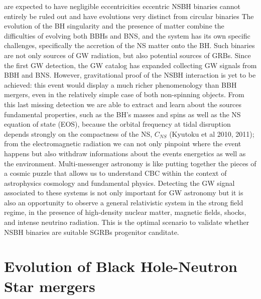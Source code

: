 \documentclass[binding=0.6cm, LaM]{sapthesis}
\begin{document}
        are expected to have negligible eccentricities %
        eccentric NSBH binaries cannot entirely be ruled out
        and have evolutions very distinct from circular binaries %
        The evolution of the BH singularity and the presence of matter combine
        the difficulties of evolving both BBHs and BNS, and the system has its own specific challenges,
        specifically the accretion of the NS matter onto the BH.
        Such binaries are not only sources of GW radiation, but also potential sources of GRBs.
        Since the first GW detection, the GW catalog has expanded collecting GW signals from BBH and BNS.
        However, gravitational proof of the NSBH interaction is yet to be achieved:
        this event would display a much richer phenomenology than BBH mergers,
        even in the relatively simple case of both non-spinning objects.
        From this last missing detection we are able to extract and learn about
        the sources fundamental properties, such as the BH’s masses and spins
        as well as the NS equation of state (EOS), because the orbital frequency at tidal disruption
        depends strongly on the compactness of the NS, $C_{NS}$ (Kyutoku et al 2010, 2011);
        from the electromagnetic radiation we can not only
        pinpoint where the event happens but also withdraw informations about the events energetics as well as the environment.
        Multi-messenger astronomy is like putting together the pieces of a cosmic puzzle
        that allows us to understand CBC within the context of astrophysics cosmology and fundamental physics.
        Detecting the GW signal associated to these systems is not only important for
        GW astronomy but it is also an opportunity to observe a general relativistic system in the strong field regime,
        in the presence of high-density nuclear matter, magnetic fields, shocks, and intense neutrino radiation.
        This is the optimal scenario to validate whether NSBH binaries are suitable SGRBs progenitor canditate.

\section{Evolution of Black Hole-Neutron Star mergers}
\end{document}
